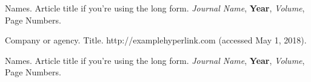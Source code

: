 \documentclass[9.5pt,twocolumn]{article}
\begin{document}



\begin{thebibliography}{99}

Names.
Article title if you're using the long form.
\textit{Journal Name},
\textbf{Year},
\textit{Volume},
Page Numbers.

Company or agency. Title. http://examplehyperlink.com (accessed May 1, 2018).

Names.
Article title if you're using the long form.
\textit{Journal Name},
\textbf{Year},
\textit{Volume},
Page Numbers.


\end{thebibliography}
\end{document}
